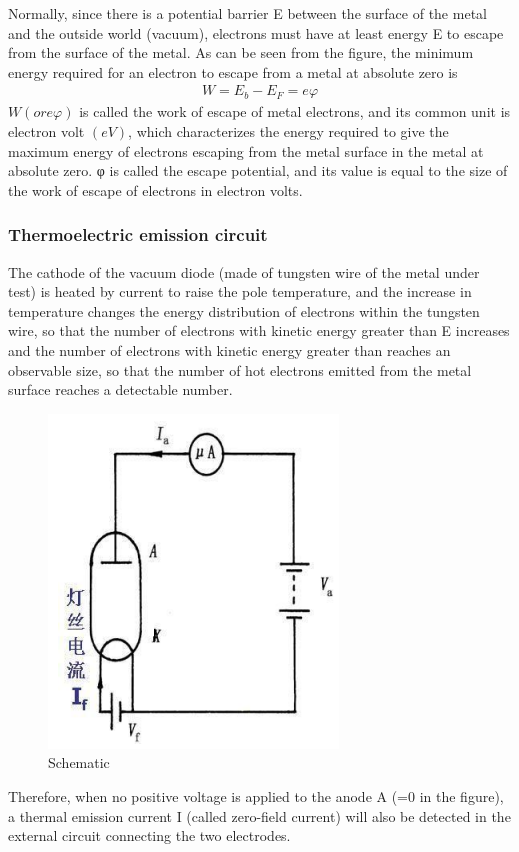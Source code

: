 \documentclass[UTF8]{article}
\begin{document}
   Normally, since there is a potential barrier E between the surface of the metal and the outside world (vacuum), electrons must have at least energy E to escape from the surface of the metal. As can be seen from the figure, the minimum energy required for an electron to escape from a metal at absolute zero is
   \begin{eqnarray}
   W=E_{b}-E_{F}=e \varphi
   \end{eqnarray}
   $W (or e\varphi)$ is called the work of escape of metal electrons, and its common unit is electron volt $(eV)$, which characterizes the energy required to give the maximum energy of electrons escaping from the metal surface in the metal at absolute zero. φ is called the escape potential, and its value is equal to the size of the work of escape of electrons in electron volts.
   
   \subsubsection{Thermoelectric emission circuit}
   
   The cathode of the vacuum diode (made of tungsten wire of the metal under test) is heated by  current to raise the pole temperature, and the increase in temperature changes the energy distribution of electrons within the tungsten wire, so that the number of electrons with kinetic energy greater than E increases and the number of electrons with kinetic energy greater than reaches an observable size, so that the number of hot electrons emitted from the metal surface reaches a detectable number.
   	\begin{figure}[H]
           	\centering
           	\includegraphics[clip,scale=1,trim={0 0 0 0}]{fig/fig6.png}
               \caption{Schematic}
               \label{figure.6}
      \end{figure} 
   Therefore, when no positive voltage is applied to the anode A (=0 in the figure), a thermal
   emission current I (called zero-field current) will also be detected in the external circuit
   connecting the two electrodes.
   
\end{document}
